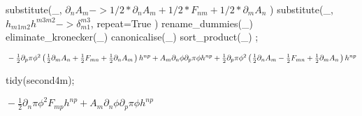 \documentclass[10pt]{article}
\newcommand\brwrap[3]{%
  \setbox0=\hbox{$#2$}
  \left#1\vbox to \the\ht0{\hbox to 0pt{}}\right.\kern-.2em
  \begingroup #2\endgroup\kern-.15em
  \left.\vbox to \the\ht0{\hbox to 0pt{}}\right#3
}
\begin{document}
\begin{python}
substitute(_, $\partial_{n}{A_{m}} -> 1/2*\partial_{n}{A_{m}} + 1/2*F_{n m} + 1/2*\partial_{m}{A_{n}}$ )
substitute(_, $h_{m1 m2} h^{m3 m2} -> \delta_{m1}^{m3}$, repeat=True )
rename_dummies(_)
eliminate_kronecker(_)
canonicalise(_)
sort_product(_)
;
\end{python}
\begin{adjustwidth}{1em}{0cm}${} - \frac{1}{2}\partial_{p}{\pi} {\phi}^{2} \brwrap{(}{\frac{1}{2}\partial_{m}{A_{n}}+\frac{1}{2}F_{m n}+\frac{1}{2}\partial_{n}{A_{m}}}{)} h^{n p}+A_{m} \partial_{n}{\phi} \partial_{p}{\pi} \phi h^{n p}+\frac{1}{2}\partial_{p}{\pi} {\phi}^{2} \brwrap{(}{\frac{1}{2}\partial_{n}{A_{m}} - \frac{1}{2}F_{m n}+\frac{1}{2}\partial_{m}{A_{n}}}{)} h^{n p}$\end{adjustwidth}
\begin{python}
tidy(second4m);
\end{python}
\begin{adjustwidth}{1em}{0cm}${} - \frac{1}{2}\partial_{n}{\pi} {\phi}^{2} F_{m p} h^{n p}+A_{m} \partial_{n}{\phi} \partial_{p}{\pi} \phi h^{n p}$\end{adjustwidth}
\begin{python}
\end{python}
\end{document}
